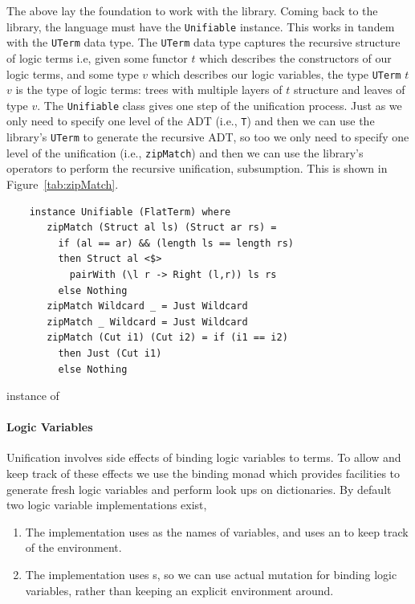 \documentclass[thesis-solanki.tex]{subfiles}
\begin{document}
The above lay the foundation to work with the library.
Coming back to the library, the language must have the \Verb!Unifiable! instance.
This works in tandem with the \Verb!UTerm! data type.
The \Verb!UTerm! data type captures the recursive structure of logic terms i.e, given some functor \(t\) which describes the
constructors of our logic terms, and some type \(v\) which describes our logic variables, the type
\Verb!UTerm! \(t\) \(v\) is the
type of logic terms: trees with multiple layers of \(t\) structure and leaves of type \(v\).
The \Verb!Unifiable! class gives one step of the unification process.
Just as we only need to specify one level of the ADT (i.e., \Verb!T!) and then we can use the library's \Verb!UTerm! to generate
the recursive ADT, so too we only need to specify one level of the unification (i.e., \Verb!zipMatch!) and then we can use
the library's operators to perform the recursive unification, subsumption.
This is shown in Figure~\ref{tab:zipMatch}.
\begin{code-list}
  \begin{verbatim}
    instance Unifiable (FlatTerm) where
       zipMatch (Struct al ls) (Struct ar rs) =
         if (al == ar) && (length ls == length rs)
         then Struct al <$>
           pairWith (\l r -> Right (l,r)) ls rs
         else Nothing
       zipMatch Wildcard _ = Just Wildcard
       zipMatch _ Wildcard = Just Wildcard
       zipMatch (Cut i1) (Cut i2) = if (i1 == i2)
         then Just (Cut i1)
         else Nothing
  \end{verbatim}
  \vspace*{-0.5\baselineskip}
  \caption{\protect{} instance of \protect{}}
  \label{tab:zipMatch}
\end{code-list}

\paragraph{Logic Variables}
Unification involves side effects of binding logic variables to terms. To allow and keep track of these effects we use the binding monad
which provides facilities to generate fresh logic variables and perform look ups on dictionaries. By default two logic variable
implementations exist,

\begin{enumerate}
\item The  implementation uses  as the names of variables, and uses an
   to keep track of the environment. 

\item The  implementation uses s, so we can use actual mutation for binding logic
  variables, rather than keeping an explicit environment around.

\end{enumerate}
\end{document}

